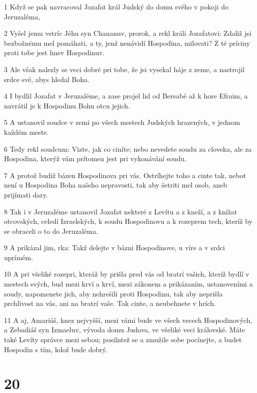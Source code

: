 \par 1 Když se pak navracoval Jozafat král Judský do domu svého v pokoji do Jeruzaléma,
\par 2 Vyšel jemu vstríc Jéhu syn Chananuv, prorok, a rekl králi Jozafatovi: Zdaliž jsi bezbožnému mel pomáhati, a ty, jenž nenávidí Hospodina, milovati? Z té príciny proti tobe jest hnev Hospodinuv.
\par 3 Ale však nalezly se veci dobré pri tobe, že jsi vysekal háje z zeme, a nastrojil srdce své, abys hledal Boha.
\par 4 I bydlil Jozafat v Jeruzaléme, a zase projel lid od Bersabé až k hore Efraim, a navrátil je k Hospodinu Bohu otcu jejich.
\par 5 A ustanovil soudce v zemi po všech mestech Judských hrazených, v jednom každém meste.
\par 6 Tedy rekl soudcum: Vizte, jak co ciníte; nebo nevedete soudu za cloveka, ale za Hospodina, kterýž vám prítomen jest pri vykonávání soudu.
\par 7 A protož budiž bázen Hospodinova pri vás. Ostríhejte toho a cinte tak, nebot není u Hospodina Boha našeho nepravosti, tak aby šetriti mel osob, aneb prijímati dary.
\par 8 Tak i v Jeruzaléme ustanovil Jozafat nekteré z Levítu a z kneží, a z knížat otcovských, celedí Izraelských, k soudu Hospodinovu a k rozeprem tech, kteríž by se obraceli o to do Jeruzaléma.
\par 9 A prikázal jim, rka: Takž delejte v bázni Hospodinove, u víre a v srdci uprímém.
\par 10 A pri všeliké rozepri, kteráž by prišla pred vás od bratrí vašich, kteríž bydlí v mestech svých, bud mezi krví a krví, mezi zákonem a prikázaním, ustanoveními a soudy, napomenete jich, aby nehrešili proti Hospodinu, tak aby neprišla prchlivost na vás, ani na bratrí vaše. Tak cinte, a neubehnete v hrích.
\par 11 A aj, Amariáš, knez nejvyšší, mezi vámi bude ve všech vecech Hospodinových, a Zebadiáš syn Izmaeluv, vývoda domu Judova, ve všeliké veci královské. Máte také Levíty správce mezi sebou; posilntež se a zmužile sobe pocínejte, a budet Hospodin s tím, kdož bude dobrý.

\chapter{20}

